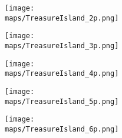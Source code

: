 \begin{minipage}{0.4\paperwidth}
  \centering
  \texttt{[image: \\maps/TreasureIsland\_2p.png]}
\end{minipage}
\begin{minipage}{0.4\paperwidth}
  \centering
  \texttt{[image: \\maps/TreasureIsland\_3p.png]}
\end{minipage}
\vspace{1em}
\linebreak
\begin{minipage}{0.4\paperwidth}
  \centering
  \texttt{[image: \\maps/TreasureIsland\_4p.png]}
\end{minipage}
\begin{minipage}{0.4\paperwidth}
  \centering
  \texttt{[image: \\maps/TreasureIsland\_5p.png]}
\end{minipage}
\vspace{1em}
\linebreak
\begin{minipage}{0.4\paperwidth}
  \centering
  \texttt{[image: \\maps/TreasureIsland\_6p.png]}
\end{minipage}
